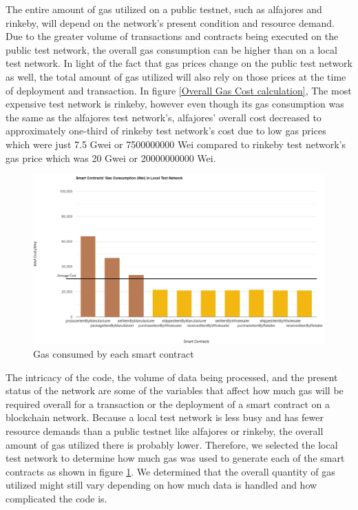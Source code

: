 \vspace{.5cm}

The entire amount of gas utilized on a public testnet, such as alfajores and rinkeby, will depend on the network's present condition and resource demand. Due to the greater volume of transactions and contracts being executed on the public test network, the overall gas consumption can be higher than on a local test network. In light of the fact that gas prices change on the public test network as well, the total amount of gas utilized will also rely on those prices at the time of deployment and transaction. In figure \ref{Overall Gas Cost calculation}, The most expensive test network is rinkeby, however even though its gas consumption was the same as the alfajores test network's, alfajores' overall cost decreased to approximately one-third of rinkeby test network's cost due to low gas prices which were just 7.5 Gwei or 7500000000 Wei compared to rinkeby test network's gas price which was 20 Gwei or 20000000000 Wei.



\begin{figure}[!h]
\centering
  \includegraphics[width=12cm]{includes/figures/smartcontractgas.png} 
  \caption{Gas consumed by each smart contract}
  \label{Gas consumed by each contract}
\end{figure}

\vspace{.5cm}
The intricacy of the code, the volume of data being processed, and the present status of the network are some of the variables that affect how much gas will be required overall for a transaction or the deployment of a smart contract on a blockchain network. Because a local test network is less busy and has fewer resource demands than a public testnet like alfajores or rinkeby, the overall amount of gas utilized there is probably lower. Therefore, we selected the local test network to determine how much gas was used to generate each of the smart contracts as shown in figure \ref{Gas consumed by each contract}. We determined that the overall quantity of gas utilized might still vary depending on how much data is handled and how complicated the code is.


